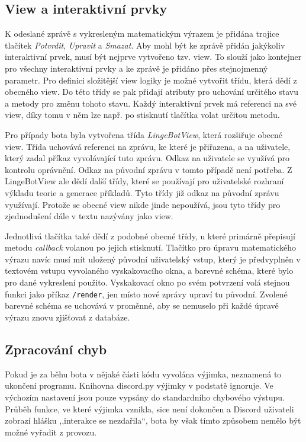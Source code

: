 \documentclass[FM]{tulthesis}
\begin{document}
	\subsection{View a interaktivní prvky}
	
	K odeslané zprávě s vykresleným matematickým výrazem je přidána trojice tlačítek \textit{Potvrdit}, \textit{Upravit} a \textit{Smazat}. Aby mohl být ke zprávě přidán jakýkoliv interaktivní prvek, musí být nejprve vytvořeno tzv. view. To slouží jako kontejner pro všechny interaktivní prvky a ke zprávě je přidáno přes stejnojmenný parametr. Pro definici složitější view logiky je možné vytvořit třídu, která dědí z obecného view. Do této třídy se pak přidají atributy pro uchování určitého stavu a metody pro změnu tohoto stavu. Každý interaktivní prvek má referenci na své view, díky tomu v něm lze např. po stisknutí tlačítka volat určitou metodu.
	
	Pro případy bota byla vytvořena třída \textit{LingeBotView}, která rozšiřuje obecné view. Třída uchovává referenci na zprávu, ke které je přiřazena, a na uživatele, který zadal příkaz vyvolávající tuto zprávu. Odkaz na uživatele se využívá pro kontrolu oprávnění. Odkaz na původní zprávu v tomto případě není potřeba. Z \mbox{LingeBotView} ale dědí další třídy, které se používají pro uživatelské rozhraní výkladu teorie a generace příkladů. Tyto třídy již odkaz na původní zprávu využívají. Protože se obecné view nikde jinde nepoužívá, jsou tyto třídy pro zjednodušení dále v textu nazývány jako view. 
	
	Jednotlivá tlačítka také dědí z podobné obecné třídy, u které primárně přepisují metodu \textit{callback} volanou po jejich stisknutí. Tlačítko pro úpravu matematického výrazu navíc musí mít uložený původní uživatelský vstup, který je předvyplněn v textovém vstupu vyvolaného vyskakovacího okna, a barevné schéma, které bylo pro dané vykreslení použito. Vyskakovací okno po svém potvrzení volá stejnou funkci jako příkaz \verb|/render|, jen místo nové zprávy upraví tu původní. Zvolené barevné schéma se uchovává v proměnné, aby se nemuselo při každé úpravě výrazu znovu zjišťovat z databáze.
			
	
	\subsection{Zpracování chyb}
	
	Pokud je za běhu bota v nějaké části kódu vyvolána výjimka, neznamená to ukončení programu. Knihovna discord.py výjimky v podstatě ignoruje. Ve výchozím nastavení jsou pouze vypsány do standardního chybového výstupu. Průběh funkce, ve které výjimka vznikla, sice není dokončen a Discord uživateli zobrazí hlášku ,,interakce se nezdařila``, bota by však tímto způsobem nemělo být možné vyřadit z provozu.
	
\end{document}
